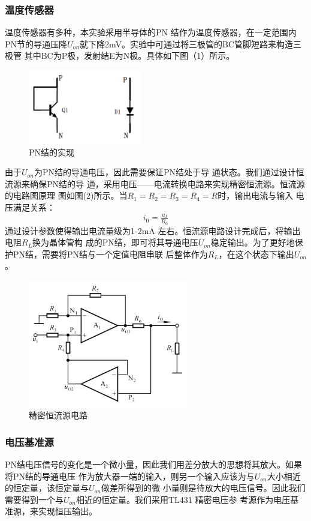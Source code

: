 \documentclass[12pt,a4paper]{ctexart}
\begin{document}
\subsubsection{温度传感器}
温度传感器有多种，本实验采用半导体的PN 结作为温度传感器，在一定范围内
PN节的导通压降$U_{on}$就下降2mV。实验中可通过将三极管的BC管脚短路来构造三极管
其中BC为P极，发射结E为N极。具体如下图（1）所示。
\begin{figure}[H]
  \centering
  \includegraphics[width=5cm]{pic/2.1.1.png}
  \caption{PN结的实现}
\end{figure}
由于$U_{on}$为PN结的导通电压，因此需要保证PN结处于导
通状态。我们通过设计恒流源来确保PN结的导
通，采用电压——电流转换电路来实现精密恒流源。恒流源的电路图原理
图如图(2)所示。当$R_1=R_2=R_3=R_4=R$时，输出电流与输入
电压满足关系：
\begin{equation}
  i_0=\tfrac{u_I}{R_0}
\end{equation}
\qquad 通过设计参数使得输出电流量级为1-2mA 左右。恒流源电路设计完成后，将输出电阻$R_L$换为晶体管构
成的PN结，即可将其导通电压$U_{on}$稳定输出。为了更好地保护PN结，需要将PN结与一个定值电阻串联
后整体作为$R_L$，在这个状态下输出$U_{on}$。
\begin{figure}[H]
  \centering
  \includegraphics[width=7cm]{pic/2.1.2.png}
  \caption{精密恒流源电路}
\end{figure}

\subsubsection{电压基准源}
\quad PN结电压信号的变化是一个微小量，因此我们用差分放大的思想将其放大。如果将PN结的导通电压
作为放大器一端的输入，则另一个输入应该为与$U_{on}$大小相近的恒定量，该恒定量与$U_{on}$做差所得到的微
小量则是待放大的电压信号。因此我们需要得到一个与$U_{on}$相近的恒定量。我们采用TL431 精密电压参
考源作为电压基准源，来实现恒压输出。
\end{document}
